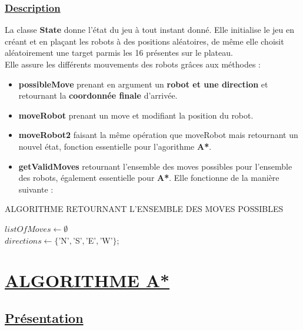 \documentclass[12pt]{article}
\begin{document}
	\subsubsection{\underline{Description}}
	La classe \textbf{State} donne l'état du jeu à tout instant donné. Elle initialise le jeu en créant et en plaçant les robots
	à des positions aléatoires, de même elle choisit aléatoirement une target parmis les 16 présentes sur le plateau.\\
	Elle assure les différents mouvements des robots grâces aux méthodes : 
	\begin{itemize}
		\item \textbf{possibleMove} prenant en argument un \textbf{robot et une direction} et retournant la \textbf{coordonnée finale} d'arrivée.
		\item \textbf{moveRobot} prenant un move et modifiant la position du robot.
		\item \textbf{moveRobot2} faisant la même opération que moveRobot mais retournant un nouvel état, fonction essentielle pour l'agorithme \textbf{A*}.
		\item \textbf{getValidMoves} retournant l'ensemble des moves possibles pour l'ensemble des robots, également essentielle pour \textbf{A*}. Elle fonctionne de la 
				manière suivante :
	\end{itemize}
	\begin{algorithm}
		\caption{ALGORITHME RETOURNANT L'ENSEMBLE DES MOVES POSSIBLES}
		$listOfMoves \gets \emptyset$\\
		$directions \gets \{$'N'$, $'S'$, $'E'$, $'W'$\}$;\\
		\label{algoVM}
	\end{algorithm}
	\newpage

	\section{\underline{ALGORITHME A*}}
	\subsection{\underline{Présentation}}
\end{document}

